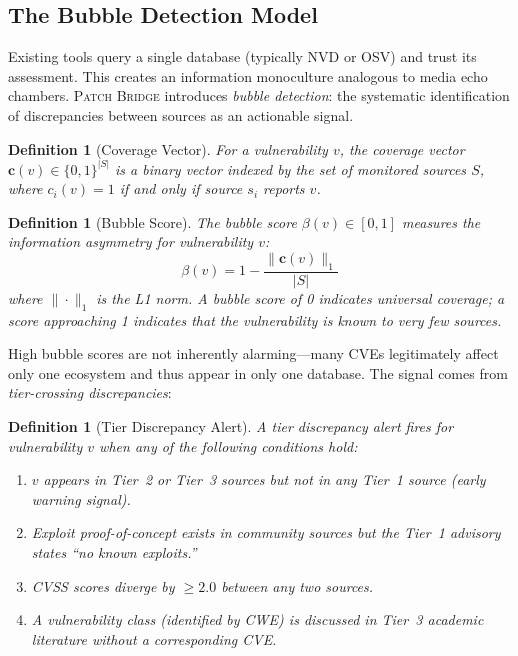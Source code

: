 \documentclass[11pt,twocolumn]{article}
\newtheorem{definition}[theorem]{Definition}
\begin{document}
\subsection{The Bubble Detection Model}
\label{sec:bubble}

Existing tools query a single database (typically NVD or OSV) and trust
its assessment. This creates an information monoculture analogous to
media echo chambers. \textsc{Patch Bridge} introduces \emph{bubble
detection}: the systematic identification of discrepancies between
sources as an actionable signal.

\begin{definition}[Coverage Vector]
For a vulnerability $v$, the \emph{coverage vector}
$\mathbf{c}(v) \in \{0,1\}^{|S|}$ is a binary vector indexed by the
set of monitored sources $S$, where $c_i(v) = 1$ if and only if source
$s_i$ reports $v$.
\end{definition}

\begin{definition}[Bubble Score]
The \emph{bubble score} $\beta(v) \in [0,1]$ measures the information
asymmetry for vulnerability $v$:
\begin{equation}
  \beta(v) = 1 - \frac{\|\mathbf{c}(v)\|_1}{|S|}
\end{equation}
where $\|\cdot\|_1$ is the L1 norm. A bubble score of 0 indicates
universal coverage; a score approaching 1 indicates that the
vulnerability is known to very few sources.
\end{definition}

High bubble scores are not inherently alarming---many CVEs legitimately
affect only one ecosystem and thus appear in only one database. The
signal comes from \emph{tier-crossing discrepancies}:

\begin{definition}[Tier Discrepancy Alert]
A \emph{tier discrepancy alert} fires for vulnerability $v$ when any
of the following conditions hold:
\begin{enumerate}[nosep]
  \item $v$ appears in Tier~2 or Tier~3 sources but \emph{not} in any
    Tier~1 source (early warning signal).
  \item Exploit proof-of-concept exists in community sources but the
    Tier~1 advisory states ``no known exploits.''
  \item CVSS scores diverge by $\geq 2.0$ between any two sources.
  \item A vulnerability \emph{class} (identified by CWE) is discussed
    in Tier~3 academic literature without a corresponding CVE.
\end{enumerate}
\end{definition}
\end{document}
